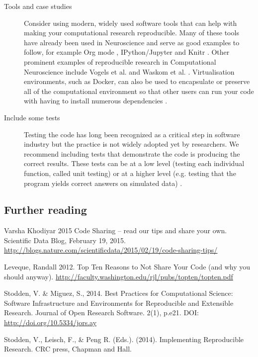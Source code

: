 \documentclass[11pt]{article}
\begin{document}
\begin{description}
\item [Tools and case studies] Consider using modern, widely used software tools that can help with making your computational research reproducible.  Many of
  these tools have already been used in Neuroscience and serve as good
  examples to follow, for example Org mode \cite{Delescluse2011},
  IPython/Jupyter \cite{Stevens2013} and Knitr \cite{Eglen2014}.  Other
  prominent examples of reproducible research in Computational
  Neuroscience include Vogels et al. \cite{Vogels2011-c8c} and Waskom et al. \cite{Waskom2014-gd}.
  Virtualisation environments, such as Docker, can also be used to
  encapsulate or preserve all of the computational environment so that
  other users can run your code with having to install numerous dependencies \cite{Boettiger2015}.

\item [Include some tests] Testing the code has long been recognized
  as a critical step in software industry but the practice is not
  widely adopted yet by researchers. We recommend including tests that
  demonstrate the code is producing the correct
  results\cite{Axelrod2014-xi}. These tests can be at a low level
  (testing each individual function, called unit testing) or at a
  higher level (e.g. testing that the program yields correct answers
  on simulated data) \cite{wilson_best_2014}.

\end{description}

\subsection*{Further reading}

Varsha Khodiyar 2015 Code Sharing – read our tips and share your own. Scientific Data Blog, February 19, 2015. \url{http://blogs.nature.com/scientificdata/2015/02/19/code-sharing-tips/}

Leveque, Randall 2012. Top Ten Reasons to Not Share Your Code (and why you should anyway). 
\url{http://faculty.washington.edu/rjl/pubs/topten/topten.pdf}

Stodden, V. \& Miguez, S., 2014. Best Practices for Computational Science: Software Infrastructure and Environments for Reproducible and Extensible Research. Journal of Open Research Software. 2(1), p.e21. DOI: \url{http://doi.org/10.5334/jors.ay}

Stodden, V., Leisch, F., \& Peng R. (Eds.). (2014). Implementing Reproducible Research. CRC press, Chapman and Hall. \cite{victoria_stodden_implementing_2014}
\end{document}
